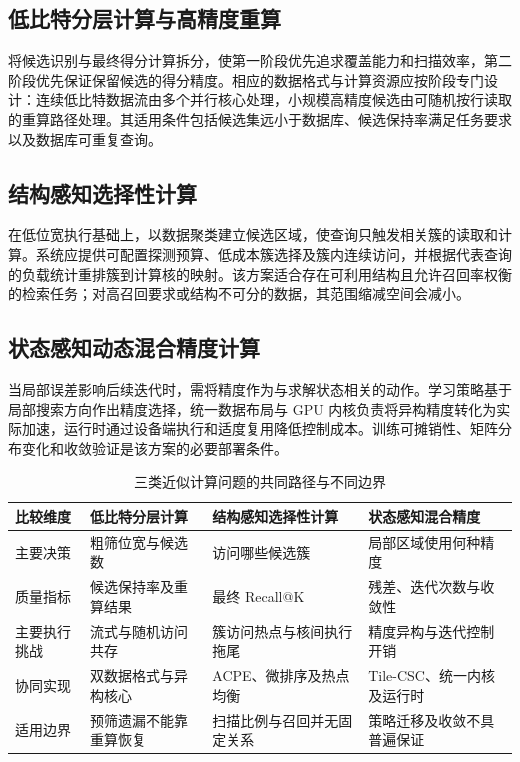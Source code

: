 \subsection{低比特分层计算与高精度重算}
将候选识别与最终得分计算拆分，使第一阶段优先追求覆盖能力和扫描效率，第二阶段优先保证保留候选的得分精度。相应的数据格式与计算资源应按阶段专门设计：连续低比特数据流由多个并行核心处理，小规模高精度候选由可随机按行读取的重算路径处理。其适用条件包括候选集远小于数据库、候选保持率满足任务要求以及数据库可重复查询。

\subsection{结构感知选择性计算}
在低位宽执行基础上，以数据聚类建立候选区域，使查询只触发相关簇的读取和计算。系统应提供可配置探测预算、低成本簇选择及簇内连续访问，并根据代表查询的负载统计重排簇到计算核的映射。该方案适合存在可利用结构且允许召回率权衡的检索任务；对高召回要求或结构不可分的数据，其范围缩减空间会减小。

\subsection{状态感知动态混合精度计算}
当局部误差影响后续迭代时，需将精度作为与求解状态相关的动作。学习策略基于局部搜索方向作出精度选择，统一数据布局与 GPU 内核负责将异构精度转化为实际加速，运行时通过设备端执行和适度复用降低控制成本。训练可摊销性、矩阵分布变化和收敛验证是该方案的必要部署条件。

\begin{table}[htbp]\centering
\caption{三类近似计算问题的共同路径与不同边界}\label{tab:unified}
\begin{tabularx}{\textwidth}{p{2.25cm}XXX}\toprule
比较维度&低比特分层计算&结构感知选择性计算&状态感知混合精度\\\midrule
主要决策&粗筛位宽与候选数&访问哪些候选簇&局部区域使用何种精度\\
质量指标&候选保持率及重算结果&最终 Recall@K&残差、迭代次数与收敛性\\
主要执行挑战&流式与随机访问共存&簇访问热点与核间执行拖尾&精度异构与迭代控制开销\\
协同实现&双数据格式与异构核心&ACPE、微排序及热点均衡&Tile-CSC、统一内核及运行时\\
适用边界&预筛遗漏不能靠重算恢复&扫描比例与召回并无固定关系&策略迁移及收敛不具普遍保证\\\bottomrule
\end{tabularx}
\end{table}

